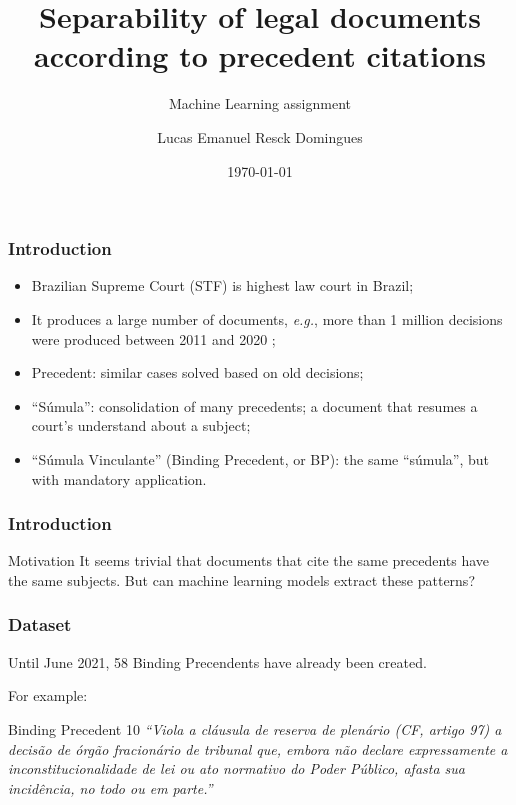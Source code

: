 \documentclass{beamer}
\title{Separability of legal documents according to precedent citations}
\subtitle{Machine Learning assignment}
\author{Lucas Emanuel Resck Domingues}
\institute[FGV-EMAp]{School of Applied Mathematics \\
Getulio Vargas Foundation \\
Professor Rodrigo Targino}
\date{\today}
\newcommand{\eg}{\textit{e.g.}}
\begin{document}
    \frame{\titlepage}

    \begin{frame}
        \frametitle{Introduction}
        \begin{itemize}
            \item Brazilian Supreme Court (STF) is highest law court in Brazil; \pause
            \item It produces a large number of documents, \eg, more than 1 million decisions were produced between 2011 and 2020 \cite{stf}; \pause
            \item Precedent: similar cases solved based on old decisions;\pause
            \item ``Súmula'': consolidation of many precedents; a document that resumes a court's understand about a subject;\pause
            \item ``Súmula Vinculante'' (Binding Precedent, or BP): the same ``súmula'', but with mandatory application.
        \end{itemize}
    \end{frame}

    \begin{frame}
        \frametitle{Introduction}
        \begin{block}{Motivation}
            It seems trivial that documents that cite the same precedents have the same subjects. \pause 
            But can machine learning models extract these patterns?            
        \end{block}
    \end{frame}

    \begin{frame}
        \frametitle{Dataset}
        Until June 2021, 58 Binding Precendents have already been created. \pause

        For example:
        \begin{block}{Binding Precedent 10}
            \textit{``Viola a cláusula de reserva de plenário (CF, artigo 97) a decisão de órgão fracionário de tribunal que, embora não declare expressamente a inconstitucionalidade de lei ou ato normativo do Poder Público, afasta sua incidência, no todo ou em parte.''}
        \end{block}
    \end{frame}
\end{document}
